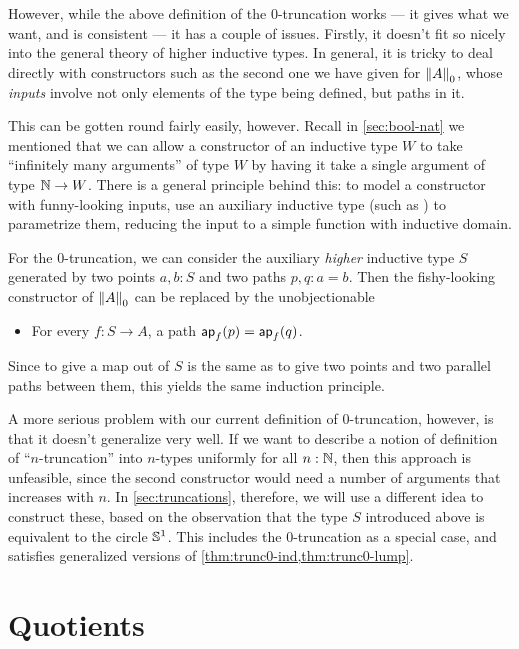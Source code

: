 However, while the above definition of the 0-truncation works --- it gives what we want, and is consistent --- it has a couple of issues.
Firstly, it doesn't fit so nicely into the general theory of higher inductive types.
In general, it is tricky to deal directly with constructors such as the second one we have given for $\trunc0A$, whose \emph{inputs} involve not only elements of the type being defined, but paths in it.

This can be gotten round fairly easily, however.
Recall in \autoref{sec:bool-nat} we mentioned that we can allow a constructor of an inductive type $W$ to take ``infinitely many arguments'' of type $W$ by having it take a single argument of type $\nat\to W$.
There is a general principle behind this: to model a constructor with funny-looking inputs, use an auxiliary inductive type (such as \nat) to parametrize them, reducing the input to a simple function with inductive domain.

For the 0-truncation, we can consider the auxiliary \emph{higher} inductive type $S$ generated by two points $a,b:S$ and two paths $p,q:a=b$.
Then the fishy-looking constructor of $\trunc 0A$ can be replaced by the unobjectionable
\begin{itemize}
\item For every $f:S\to A$, a path $\apfunc{f}(p) = \apfunc{f}(q)$.
\end{itemize}
Since to give a map out of $S$ is the same as to give two points and two parallel paths between them, this yields the same induction principle.

%

%
%
A more serious problem with our current definition of $0$-truncation, however, is that it doesn't generalize very well.
If we want to describe a notion of definition of ``$n$-truncation'' into $n$-types uniformly for all $n:\nat$, then this approach is unfeasible, since the second constructor would need a number of arguments that increases with $n$.
In \autoref{sec:truncations}, therefore, we will use a different idea to construct these, based on the observation that the type $S$ introduced above is equivalent to the circle $\Sn^1$.
This includes the 0-truncation as a special case, and satisfies generalized versions of \autoref{thm:trunc0-ind,thm:trunc0-lump}.


\section{Quotients}
\label{sec:set-quotients}

